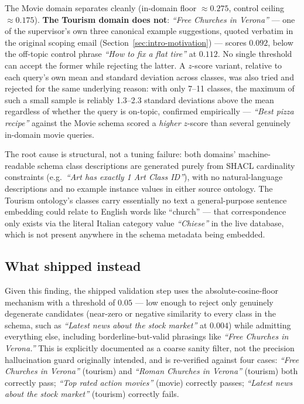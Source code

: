\documentclass[11pt,a4paper,oneside]{book}
\begin{document}
The Movie domain separates cleanly (in-domain floor $\approx 0.275$, control ceiling $\approx
0.175$). \textbf{The Tourism domain does not}: \emph{``Free Churches in Verona''} --- one of the
supervisor's own three canonical example suggestions, quoted verbatim in the original scoping email
(Section~\ref{sec:intro-motivation}) --- scores $0.092$, below the off-topic control phrase
\emph{``How to fix a flat tire''} at $0.112$. No single threshold can accept the former while
rejecting the latter. A $z$-score variant, relative to each query's own mean and standard deviation
across classes, was also tried and rejected for the same underlying reason: with only 7--11 classes,
the maximum of such a small sample is reliably 1.3--2.3 standard deviations above the mean
regardless of whether the query is on-topic, confirmed empirically --- \emph{``Best pizza recipe''}
against the Movie schema scored a \emph{higher} $z$-score than several genuinely in-domain movie
queries.

The root cause is structural, not a tuning failure: both domains' machine-readable schema class
descriptions are generated purely from SHACL cardinality constraints (e.g.\ \emph{``Art has exactly
1 Art Class ID''}), with no natural-language descriptions and no example instance values in either
source ontology. The Tourism ontology's classes carry essentially no text a general-purpose sentence
embedding could relate to English words like ``church'' --- that correspondence only exists via the
literal Italian category value \emph{``Chiese''} in the live database, which is not present anywhere
in the schema metadata being embedded.

\subsection{What shipped instead}

Given this finding, the shipped validation step uses the absolute-cosine-floor mechanism with a
threshold of $0.05$ --- low enough to reject only genuinely degenerate candidates (near-zero or
negative similarity to every class in the schema, such as \emph{``Latest news about the stock
market''} at $0.004$) while admitting everything else, including borderline-but-valid phrasings like
\emph{``Free Churches in Verona.''} This is explicitly documented as a coarse sanity filter, not the
precision hallucination guard originally intended, and is re-verified against four cases:
\emph{``Free Churches in Verona''} (tourism) and \emph{``Roman Churches in Verona''} (tourism) both
correctly pass; \emph{``Top rated action movies''} (movie) correctly passes; \emph{``Latest news
about the stock market''} (tourism) correctly fails.
\end{document}
